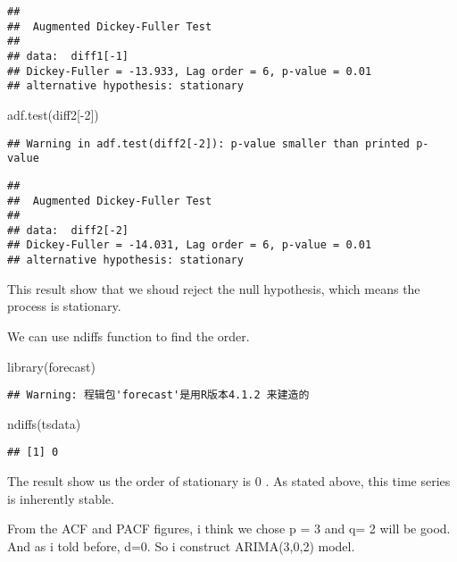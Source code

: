 \documentclass[
]{article}
\newenvironment{Shaded}{\begin{snugshade}}{\end{snugshade}}
\newcommand{\DecValTok}[1]{\textcolor[rgb]{0.00,0.00,0.81}{#1}}
\newcommand{\FunctionTok}[1]{\textcolor[rgb]{0.00,0.00,0.00}{#1}}
\newcommand{\NormalTok}[1]{#1}
\newcommand{\SpecialCharTok}[1]{\textcolor[rgb]{0.00,0.00,0.00}{#1}}
\begin{document}
\begin{verbatim}
## 
##  Augmented Dickey-Fuller Test
## 
## data:  diff1[-1]
## Dickey-Fuller = -13.933, Lag order = 6, p-value = 0.01
## alternative hypothesis: stationary
\end{verbatim}

\begin{Shaded}
\begin{Highlighting}[]
\FunctionTok{adf.test}\NormalTok{(diff2[}\SpecialCharTok{{-}}\DecValTok{2}\NormalTok{])}
\end{Highlighting}
\end{Shaded}

\begin{verbatim}
## Warning in adf.test(diff2[-2]): p-value smaller than printed p-value
\end{verbatim}

\begin{verbatim}
## 
##  Augmented Dickey-Fuller Test
## 
## data:  diff2[-2]
## Dickey-Fuller = -14.031, Lag order = 6, p-value = 0.01
## alternative hypothesis: stationary
\end{verbatim}

This result show that we shoud reject the null hypothesis, which means
the process is stationary.

We can use ndiffs function to find the order.

\begin{Shaded}
\begin{Highlighting}[]
\FunctionTok{library}\NormalTok{(forecast)}
\end{Highlighting}
\end{Shaded}

\begin{verbatim}
## Warning: 程辑包'forecast'是用R版本4.1.2 来建造的
\end{verbatim}

\begin{Shaded}
\begin{Highlighting}[]
\FunctionTok{ndiffs}\NormalTok{(tsdata)}
\end{Highlighting}
\end{Shaded}

\begin{verbatim}
## [1] 0
\end{verbatim}

The result show us the order of stationary is 0 . As stated above, this
time series is inherently stable.

From the ACF and PACF figures, i think we chose p = 3 and q= 2 will be
good. And as i told before, d=0. So i construct ARIMA(3,0,2) model.
\end{document}
